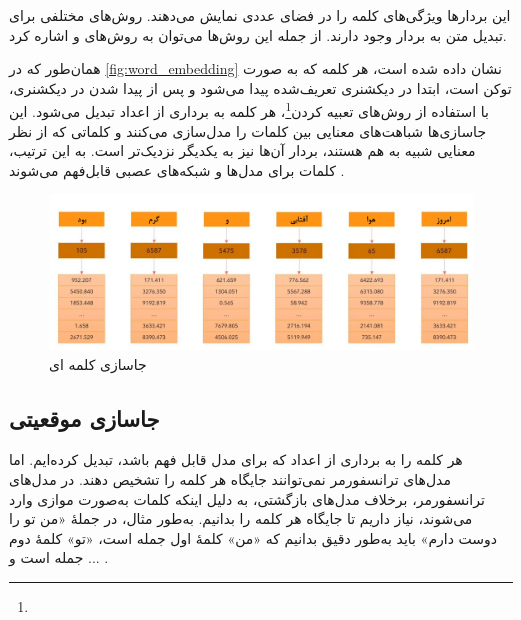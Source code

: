 این بردارها ویژگی‌های کلمه را در فضای عددی نمایش می‌دهند. روش‌های مختلفی برای تبدیل متن به بردار وجود دارند. از جمله این روش‌ها می‌توان به روش‌های  \cite{mikolov2013distributed} و  \cite{pennington2014glove} اشاره کرد.

همان‌طور که در \autoref{fig:word_embedding} نشان داده شده است، هر کلمه که به صورت توکن است، ابتدا در دیکشنری تعریف‌شده پیدا می‌شود و پس از پیدا شدن در دیکشنری، با استفاده از روش‌های تعبیه کردن\footnote{}، هر کلمه به برداری از اعداد تبدیل می‌شود. این جاسازی‌ها شباهت‌های معنایی بین کلمات را مدل‌سازی می‌کنند و کلماتی که از نظر معنایی شبیه به هم هستند، بردار آن‌ها نیز به یکدیگر نزدیک‌تر است. به این ترتیب، کلمات برای مدل‌ها و شبکه‌های عصبی قابل‌فهم می‌شوند \cite{mikolov2013distributed,pennington2014glove}.





 \begin{figure}[h]
 	\centering
 	\begin{minipage}[b]{0.7\textwidth}
 		\centering
 		\includegraphics[width=\textwidth]{transformer_images/persian images/persian_images/b16.png}
 		\caption{جاسازی کلمه ای}
 		\label{fig:word_embedding}
 	\end{minipage}
 	\hfill
 \end{figure}
 
 
 

 
 
 
 



\subsection{جاسازی موقعیتی}

هر کلمه را به برداری از اعداد که برای مدل قابل فهم باشد، تبدیل کرده‌ایم. اما مدل‌های ترانسفورمر نمی‌توانند جایگاه هر کلمه را تشخیص دهند. در مدل‌های ترانسفورمر، برخلاف مدل‌های بازگشتی، به دلیل اینکه کلمات به‌صورت موازی وارد می‌شوند، نیاز داریم تا جایگاه هر کلمه را بدانیم. به‌طور مثال، در جملهٔ «من تو را دوست دارم» باید به‌طور دقیق بدانیم که «من» کلمهٔ اول جمله است، «تو» کلمهٔ دوم جمله است و ... .

